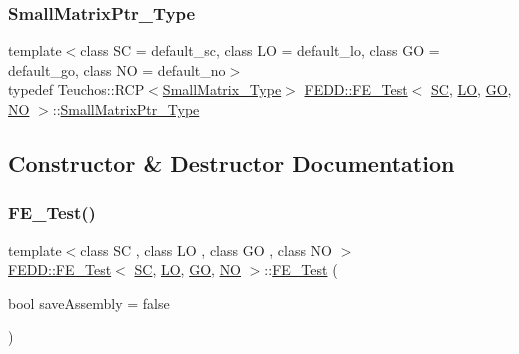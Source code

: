 \mbox{\label{classFEDD_1_1FE__Test_a675b52d9e58407c6baadb403394be92b}} 
\subsubsection{\texorpdfstring{Small\+Matrix\+Ptr\+\_\+\+Type}{SmallMatrixPtr\_Type}}
{\footnotesize\ttfamily template$<$class SC  = default\+\_\+sc, class LO  = default\+\_\+lo, class GO  = default\+\_\+go, class NO  = default\+\_\+no$>$ \\
typedef Teuchos\+::\+R\+CP$<$\hyperlink{classFEDD_1_1FE__Test_a11f3375e690a493e9076b63b0f86edf4}{Small\+Matrix\+\_\+\+Type}$>$ \hyperlink{classFEDD_1_1FE__Test}{F\+E\+D\+D\+::\+F\+E\+\_\+\+Test}$<$ \hyperlink{fe__test__laplace_8cpp_a79c7e86a57edbb2a5a53242bcd04e41e}{SC}, \hyperlink{fe__test__laplace_8cpp_ad6a38c9f07d3fd633eefca5bccad8410}{LO}, \hyperlink{fe__test__laplace_8cpp_afa2946b509009b4f45eb04bd8c5b27d9}{GO}, \hyperlink{fe__test__laplace_8cpp_a5e24f37b28787429872b6ecb1d0417ce}{NO} $>$\+::\hyperlink{classFEDD_1_1FE__Test_a675b52d9e58407c6baadb403394be92b}{Small\+Matrix\+Ptr\+\_\+\+Type}}



\subsection{Constructor \& Destructor Documentation}
\mbox{\label{classFEDD_1_1FE__Test_a2e9a8640f2f6ed99376efbe84298e744}} 
\subsubsection{\texorpdfstring{F\+E\+\_\+\+Test()}{FE\_Test()}}
{\footnotesize\ttfamily template$<$class SC , class LO , class GO , class NO $>$ \\
\hyperlink{classFEDD_1_1FE__Test}{F\+E\+D\+D\+::\+F\+E\+\_\+\+Test}$<$ \hyperlink{fe__test__laplace_8cpp_a79c7e86a57edbb2a5a53242bcd04e41e}{SC}, \hyperlink{fe__test__laplace_8cpp_ad6a38c9f07d3fd633eefca5bccad8410}{LO}, \hyperlink{fe__test__laplace_8cpp_afa2946b509009b4f45eb04bd8c5b27d9}{GO}, \hyperlink{fe__test__laplace_8cpp_a5e24f37b28787429872b6ecb1d0417ce}{NO} $>$\+::\hyperlink{classFEDD_1_1FE__Test}{F\+E\+\_\+\+Test} (\begin{DoxyParamCaption}\item[{bool}]{save\+Assembly = {\ttfamily false} }\end{DoxyParamCaption})}



